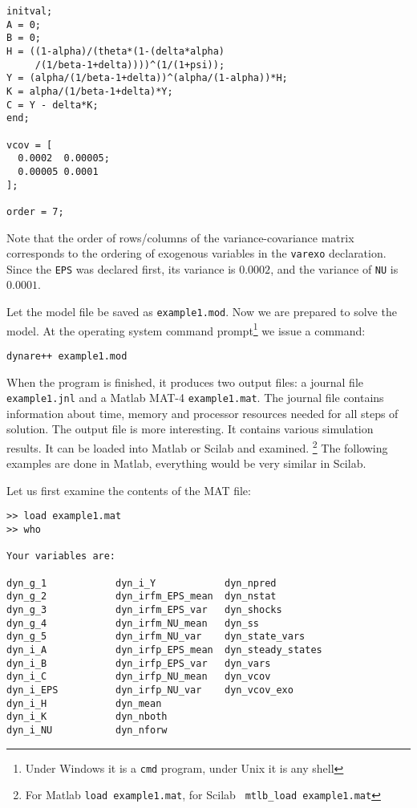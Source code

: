 \documentclass[10pt]{article}
\begin{document}
{\small
\begin{verbatim}
initval;
A = 0;
B = 0;
H = ((1-alpha)/(theta*(1-(delta*alpha)
     /(1/beta-1+delta))))^(1/(1+psi));
Y = (alpha/(1/beta-1+delta))^(alpha/(1-alpha))*H;
K = alpha/(1/beta-1+delta)*Y;
C = Y - delta*K;
end;

vcov = [
  0.0002  0.00005;
  0.00005 0.0001
];

order = 7;
\end{verbatim}
}

Note that the order of rows/columns of the variance-covariance matrix
corresponds to the ordering of exogenous variables in the {\tt varexo}
declaration. Since the {\tt EPS} was declared first, its variance is
$0.0002$, and the variance of {\tt NU} is $0.0001$.

Let the model file be saved as {\tt example1.mod}. Now we are prepared
to solve the model. At the operating system command
prompt\footnote{Under Windows it is a {\tt cmd} program, under Unix it
is any shell} we issue a command:

{\small
\begin{verbatim}
dynare++ example1.mod
\end{verbatim}
}

When the program is finished, it produces two output files: a journal
file {\tt example1.jnl} and a Matlab MAT-4 {\tt example1.mat}. The
journal file contains information about time, memory and processor
resources needed for all steps of solution. The output file is more
interesting. It contains various simulation results. It can be loaded
into Matlab or Scilab and examined.%
\footnote{For Matlab {\tt load example1.mat}, for Scilab {\tt
mtlb\_load example1.mat}} The following examples are done in Matlab,
everything would be very similar in Scilab.

Let us first examine the contents of the MAT file:
{\small
\begin{verbatim}
>> load example1.mat
>> who

Your variables are:

dyn_g_1            dyn_i_Y            dyn_npred          
dyn_g_2            dyn_irfm_EPS_mean  dyn_nstat          
dyn_g_3            dyn_irfm_EPS_var   dyn_shocks         
dyn_g_4            dyn_irfm_NU_mean   dyn_ss             
dyn_g_5            dyn_irfm_NU_var    dyn_state_vars     
dyn_i_A            dyn_irfp_EPS_mean  dyn_steady_states  
dyn_i_B            dyn_irfp_EPS_var   dyn_vars           
dyn_i_C            dyn_irfp_NU_mean   dyn_vcov           
dyn_i_EPS          dyn_irfp_NU_var    dyn_vcov_exo       
dyn_i_H            dyn_mean           
dyn_i_K            dyn_nboth          
dyn_i_NU           dyn_nforw          
\end{verbatim}
}
\end{document}
